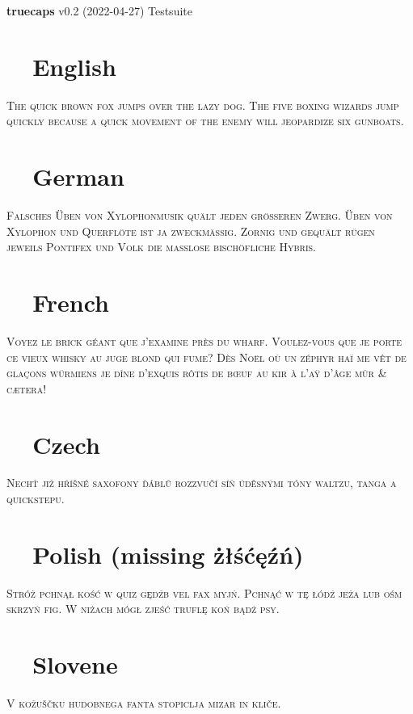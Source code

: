 \documentclass{article}
\def\checkno	{\textcolor{red}{\textbf{\ding{55}~~}}}
\def\checkyes	{\textcolor{green}{\textbf{\ding{51}~~}}}
\begin{document}
\hfill{\Large \textbf{truecaps} v0.2 (2022-04-27) Testsuite}

\vspace{-1em}\section*{\checkyes English}
\textsc{The quick brown fox jumps over the lazy dog.
The five boxing wizards jump quickly because 
a quick movement of the enemy will jeopardize six gunboats.}

\vspace{-1em}\section*{\checkyes German}
\noindent\textsc{Falsches Üben von Xylophonmusik quält jeden größeren Zwerg.
Üben von Xylophon und Querflöte ist ja zweckmäßig. 
Zornig und gequält rügen jeweils Pontifex und Volk die maßlose bischöfliche Hybris.}

\vspace{-1em}\section*{\checkyes French}
\noindent\textsc{Voyez le brick géant que j’examine près du wharf.
Voulez-vous que je porte ce vieux whisky au juge blond qui fume\medspace?
Dès Noël où un zéphyr haï me vêt de glaçons würmiens 
je dîne d’exquis rôtis de bœuf au kir à l’aÿ d’âge mûr \& cætera\medspace!}

\vspace{-1em}\section*{\checkyes Czech}
\noindent\textsc{Nechť již hříšné saxofony ďáblů rozzvučí síň úděsnými 
tóny waltzu, tanga a quickstepu.}

\vspace{-1em}\section*{\checkno Polish (missing \string żłśćęźń)}
\noindent\textsc{
Stróż pchnął kość w quiz gędźb vel fax myjń. 
Pchnąć w tę łódź jeża lub ośm skrzyń fig.
W niżach mógł zjeść truflę koń bądź psy.
}

\vspace{-1em}\section*{\checkno Slovene}
\noindent\textsc{
V kožuščku hudobnega fanta stopiclja mizar in kliče.
}
\end{document}
